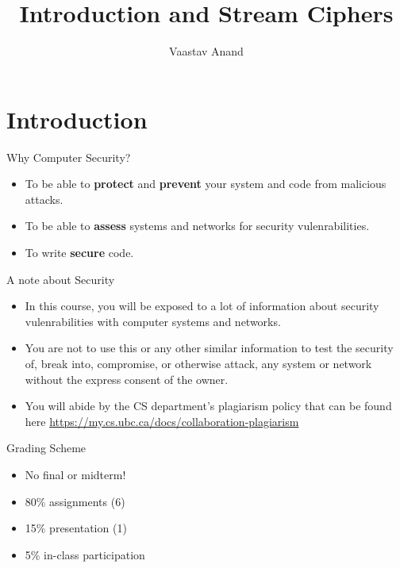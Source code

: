 \documentclass{beamer}
\title{Introduction and Stream Ciphers}
\author{Vaastav Anand}
\def\red#1{{\color{red}#1}}
\begin{document}
\begin{frame}
    \titlepage
\end{frame}

\AtBeginSection[]{
    \begin{frame}
        \tableofcontents[currentsection]
    \end{frame}
}

\section{Introduction}

\begin{frame}{Why Computer Security?}
    \begin{itemize}
        \item To be able to \textbf{protect} and \textbf{prevent} your system and code from malicious attacks.
        \item To be able to \textbf{assess} systems and networks for security vulenrabilities.
        \item To write \textbf{secure} code.
    \end{itemize}
\end{frame}

\begin{frame}{A note about Security}
    \begin{itemize}
        \item In this course, you will be exposed to a lot of information about security vulenrabilities with computer systems and networks.
        \item \red{You are not to use this or any other similar information to test the security of, break into, compromise, or otherwise attack, any system or network} without the express consent of the owner.
        \item You will abide by the CS department's plagiarism policy that can be found here \url{https://my.cs.ubc.ca/docs/collaboration-plagiarism} 
    \end{itemize}
\end{frame}

\begin{frame}{Grading Scheme}
    \begin{itemize}
        \item No final or midterm!
        \item 80\% assignments (6)
        \item 15\% presentation (1)
        \item 5\% in-class participation
    \end{itemize}
\end{frame}
\end{document}
